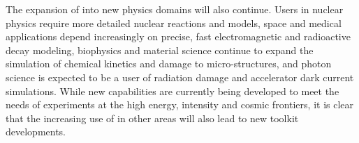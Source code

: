 The expansion of \Gfour{} into new physics domains will also continue. 
Users in nuclear physics require more detailed nuclear reactions and models, 
space and medical applications depend increasingly on precise, fast 
electromagnetic and radioactive decay modeling, biophysics and material 
science continue to expand the simulation of chemical kinetics and damage to 
micro-structures, and photon science is expected to be a user of radiation 
damage and accelerator dark current simulations.  While new capabilities are 
currently being developed to meet the needs of experiments at the high energy,
intensity and cosmic frontiers, it is clear that the increasing use of \Gfour{}
in other areas will also lead to new toolkit developments.

